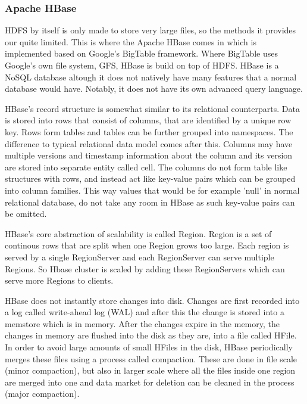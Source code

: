\subsubsection{Apache HBase}

HDFS by itself is only made to store very large files, so the methods it provides our quite limited.
This is where the Apache HBase comes in which is implemented based on Google's BigTable framework.
Where BigTable uses Google's own file system, GFS, HBase is build on top of HDFS. 
HBase is a NoSQL database altough it does not natively have many features that a normal database would have.
Notably, it does not have its own advanced query language.\cite{george}

HBase's record structure is somewhat similar to its relational counterparts.
Data is stored into rows that consist of columns, that are identified by a unique row key.
Rows form tables and tables can be further grouped into namespaces.
The difference to typical relational data model comes after this.
Columns may have multiple versions and timestamp information about the column and its version are stored into separate entity called cell.
The columns do not form table like structures with rows, and instead act like key-value pairs which can be grouped into column families.
This way values that would be for example 'null' in normal relational database, do not take any room in HBase as such key-value pairs can be omitted. \cite{george}

HBase's core abstraction of scalability is called Region.
Region is a set of continous rows that are split when one Region grows too large.
Each region is served by a single RegionServer and each RegionServer can serve multiple Regions.
So Hbase cluster is scaled by adding these RegionServers which can serve more Regions to clients. \cite{george}

HBase does not instantly store changes into disk. 
Changes are first recorded into a log called write-ahead log (WAL) and after this the change is stored into a memstore which is in memory.
After the changes expire in the memory, the changes in memory are flushed into the disk as they are, into a file called HFile. 
In order to avoid large amounts of small HFiles in the disk, HBase periodically merges these files using a process called compaction.
These are done in file scale (minor compaction), but also in larger scale where all the files inside one region are merged into one and data market for deletion can be cleaned in the process (major compaction). \cite{george}

